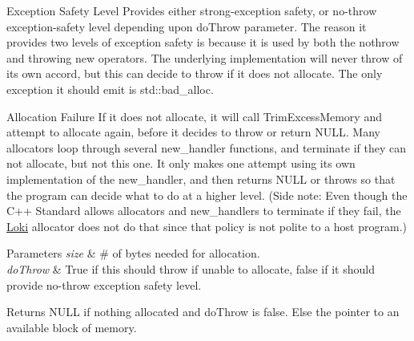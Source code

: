 \begin{DoxyParagraph}{Exception Safety Level}
Provides either strong-\/exception safety, or no-\/throw exception-\/safety level depending upon do\+Throw parameter. The reason it provides two levels of exception safety is because it is used by both the nothrow and throwing new operators. The underlying implementation will never throw of its own accord, but this can decide to throw if it does not allocate. The only exception it should emit is std\+::bad\+\_\+alloc.
\end{DoxyParagraph}
\begin{DoxyParagraph}{Allocation Failure}
If it does not allocate, it will call Trim\+Excess\+Memory and attempt to allocate again, before it decides to throw or return N\+U\+L\+L. Many allocators loop through several new\+\_\+handler functions, and terminate if they can not allocate, but not this one. It only makes one attempt using its own implementation of the new\+\_\+handler, and then returns N\+U\+L\+L or throws so that the program can decide what to do at a higher level. (Side note\+: Even though the C++ Standard allows allocators and new\+\_\+handlers to terminate if they fail, the \hyperlink{namespaceLoki}{Loki} allocator does not do that since that policy is not polite to a host program.)
\end{DoxyParagraph}

\begin{DoxyParams}{Parameters}
{\em size} & \# of bytes needed for allocation. \\
\hline
{\em do\+Throw} & True if this should throw if unable to allocate, false if it should provide no-\/throw exception safety level. \\
\hline
\end{DoxyParams}
\begin{DoxyReturn}{Returns}
N\+U\+L\+L if nothing allocated and do\+Throw is false. Else the pointer to an available block of memory. 
\end{DoxyReturn}
\hypertarget{classLoki_1_1SmallObjAllocator_a2b669733cfa9dd157603d13d979f8c1c}{}
